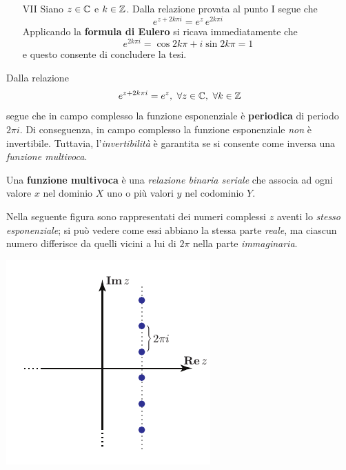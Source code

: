 \begin{demonstration}
\begin{enumerate}[label=\Roman*]
\item[VII]  Siano $z\in \mathbb{C}$ e $k\in \mathbb{Z}$. Dalla relazione provata al punto I segue che 
\begin{equation*}
	e^{z+2k\pi i}=e^{z}\, e^{2k\pi i}
\end{equation*}
Applicando la \textbf{formula di Eulero} si ricava immediatamente che 
\begin{equation*}
	e^{2k\pi i}=\cos 2k\pi +i\sin 2k\pi =1
\end{equation*}
e questo consente di concludere la tesi.\qedhere
\end{enumerate}
\end{demonstration}
\begin{observe}
	Dalla relazione
	\begin{equation*}
		e^{z+2k\pi i}=e^z,\ \forall z\in\complexset,\ \forall k\in\integerset
	\end{equation*}
	segue che in campo complesso la funzione esponenziale è \textbf{periodica} di periodo $2\pi i$.
	Di conseguenza, in campo complesso la funzione esponenziale \textit{non} è invertibile. Tuttavia, l'\textit{invertibilità} è garantita se si consente come inversa una \textit{funzione multivoca}.\\
\end{observe}
\begin{define}
	Una \textbf{funzione multivoca} è una \textit{relazione binaria seriale} che associa ad ogni valore $x$ nel dominio $X$ uno o più valori $y$ nel codominio $Y$.
\end{define}
\begin{example}
		Nella seguente figura sono rappresentati dei numeri complessi $z$ aventi lo \textit{stesso esponenziale}; si può vedere come essi abbiano la stessa parte \textit{reale}, ma ciascun numero differisce da quelli vicini a lui di $2\pi$ nella parte \textit{immaginaria}.
	\begin{center}
		\includegraphics[trim=0cm 0cm 0cm 0cm, clip, scale=1]{images/esponenziale1.pdf}
	\end{center}
\end{example}
